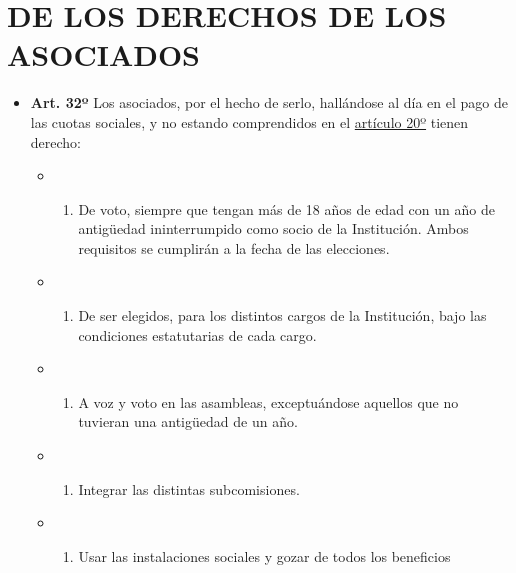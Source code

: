 \documentclass[]{book}
\providecommand{\tightlist}{%
  \setlength{\itemsep}{0pt}\setlength{\parskip}{0pt}}
\begin{document}
\chapter{DE LOS DERECHOS DE LOS ASOCIADOS}\label{cap4}

\begin{itemize}
\tightlist
\item
  \textbf{Art. 32º} Los asociados, por el hecho de serlo, hallándose al
  día en el pago de las cuotas sociales, y no estando comprendidos en el
  \protect\hyperlink{art20}{artículo 20º} tienen derecho:

  \begin{itemize}
  \item
    \begin{enumerate}
    \def\labelenumi{\alph{enumi})}
    \tightlist
    \item
      De voto, siempre que tengan más de 18 años de edad con un año de
      antigüedad ininterrumpido como socio de la Institución. Ambos
      requisitos se cumplirán a la fecha de las elecciones.
    \end{enumerate}
  \item
    \begin{enumerate}
    \def\labelenumi{\alph{enumi})}
    \setcounter{enumi}{1}
    \tightlist
    \item
      De ser elegidos, para los distintos cargos de la Institución, bajo
      las condiciones estatutarias de cada cargo.
    \end{enumerate}
  \item
    \begin{enumerate}
    \def\labelenumi{\alph{enumi})}
    \setcounter{enumi}{2}
    \tightlist
    \item
      A voz y voto en las asambleas, exceptuándose aquellos que no
      tuvieran una antigüedad de un año.
    \end{enumerate}
  \item
    \begin{enumerate}
    \def\labelenumi{\alph{enumi})}
    \setcounter{enumi}{3}
    \tightlist
    \item
      Integrar las distintas subcomisiones.
    \end{enumerate}
  \item
    \begin{enumerate}
    \def\labelenumi{\alph{enumi})}
    \setcounter{enumi}{4}
    \tightlist
    \item
      Usar las instalaciones sociales y gozar de todos los beneficios

\end{enumerate}
\end{itemize}
\end{itemize}
\end{document}
